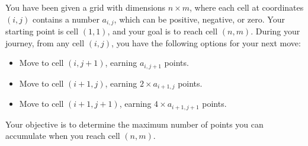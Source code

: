 You have been given a grid with dimensions $n \times m$, where each cell at coordinates $(i, j)$ contains a number $a_{i,j}$, which can be positive, negative, or zero. Your starting point is cell $(1, 1)$, and your goal is to reach cell $(n, m)$.
During your journey, from any cell $(i, j)$, you have the following options for your next move:
\begin{itemize}
    \item Move to cell $(i, j + 1)$, earning $a_{i, j + 1}$ points.
    \item Move to cell $(i + 1, j)$, earning $2 \times a_{i + 1, j}$ points.
    \item Move to cell $(i + 1, j + 1)$, earning $4 \times a_{i + 1, j + 1}$ points.
\end{itemize}
Your objective is to determine the maximum number of points you can accumulate when you reach cell $(n, m)$.